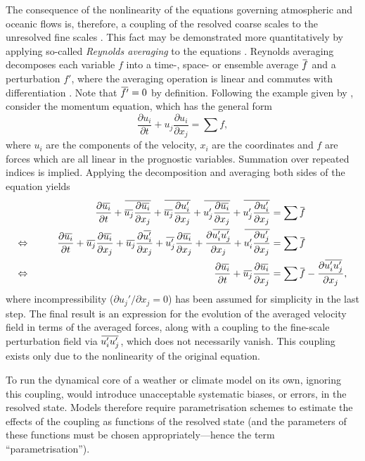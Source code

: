 \documentclass[titlepage]{article}
\numberwithin{equation}{section}
\newcommand{\pdiff}[2]{\frac{\partial #1}{\partial #2}}
\renewcommand{\bar}[1]{\mkern 1.5mu\overline{\mkern-1.5mu#1\mkern-1.5mu}\mkern 1.5mu}
\begin{document}
The consequence of the nonlinearity of the equations governing atmospheric and
oceanic flows is, therefore, a coupling of the resolved coarse scales to the
unresolved fine scales \parencite{mcfarlane2011}.
This fact may be demonstrated more quantitatively by applying so-called
\emph{Reynolds averaging} to the equations \parencite{christensen2022}.
Reynolds averaging decomposes each variable $f$ into a time-, space- or
ensemble average $\bar{f}$ and a perturbation $f'$, where the averaging
operation is linear and commutes with differentiation \parencite{monin2007}.
Note that $\bar{f'} = 0$ by definition. Following the example given by
\textcite{christensen2022}, consider the momentum equation, which has the
general form
\[
    \pdiff{u_i}{t} + u_j \pdiff{u_i}{x_j} = \sum f,
\]
where $u_i$ are the components of the velocity, $x_i$ are the coordinates and
$f$ are forces which are all linear in the prognostic variables. Summation
over repeated indices is implied. Applying the decomposition and averaging
both sides of the equation yields
\begin{alignat*}{2}
    && \pdiff{\bar{u_i}}{t} + \bar{\bar{u_j} \pdiff{\bar{u_i}}{x_j}}
        + \bar{\bar{u_j} \pdiff{u_i'}{x_j}} + \bar{u_j' \pdiff{\bar{u_i}}{x_j}}
        + \bar{u_j' \pdiff{u_i'}{x_j}} &= \sum \bar{f} \\
    \Leftrightarrow& \qquad &
        \pdiff{\bar{u_i}}{t} + \bar{u_j} \pdiff{\bar{u_i}}{x_j}
        + \bar{u_j} \pdiff{\bar{u_i'}}{x_j} + \bar{u_j'} \pdiff{\bar{u_i}}{x_j}
        + \pdiff{\bar{u_i' u_j'}}{x_j} + \bar{u_i' \pdiff{u_j'}{x_j}}
        &= \sum \bar{f} \\
    \Leftrightarrow &&
        \pdiff{\bar{u_i}}{t} + \bar{u_j} \pdiff{\bar{u_i}}{x_j}
        &= \sum \bar{f} - \pdiff{\bar{u_i' u_j'}}{x_j},
\end{alignat*}
where incompressibility ($\partial u_j' / \partial x_j = 0$) has been
assumed for simplicity in the last step. The final result is an expression
for the evolution of the averaged velocity field in terms of the averaged
forces, along with a coupling to the fine-scale perturbation field via
$\bar{u_i' u_j'}$, which does not necessarily vanish. This coupling exists
only due to the nonlinearity of the original equation.

To run the dynamical core of a weather or climate model on its own, ignoring
this coupling, would introduce unacceptable systematic biases, or errors, in
the resolved state. Models therefore require parametrisation schemes to
estimate the effects of the coupling as functions of the resolved state (and
the parameters of these functions must be chosen appropriately---hence the term
``parametrisation'').
\end{document}
